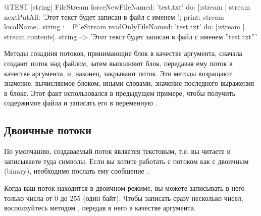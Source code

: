 \documentclass[a4paper,10pt,twoside]{book}
\begin{document}
\begin{code}{@TEST |string|}
FileStream
    forceNewFileNamed: 'test.txt'
    do: [:stream |
        stream
            nextPutAll: 'Этот текст будет записан в файл с именем ';
            print: stream localName].
string := FileStream
            readOnlyFileNamed: 'test.txt'
            do: [:stream | stream contents].
string --> 'Этот текст будет записан в файл с именем ''test.txt'''
\end{code}

Методы созадния потоков, принимающие блок в качестве аргумента, сначала создают поток над файлом, затем выполняют блок, передавая ему поток в качестве аргумента, и, наконец, закрывают поток.
Эти методы возращают значение, вычисляемое блоком, иными словами, значение последнего выражения в блоке. Этот факт использовался в предыдущем примере, чтобы получить содержимое файла и записать его в переменную .

\subsection{Двоичные потоки}

По умолчанию, создаваемый поток является текстовым, т.е. вы читаете и записываете туда символы. Если вы хотите работать с потоком как с двоичным (binary), необходимо послать ему сообщение .

Когда ваш поток находится в двоичном режиме, вы можете записывать в него только числа от 0 до 255 (один байт). Чтобы записать сразу несколько чисел, восползуйтесь методом , передав в него  в качестве аргумента.
\end{document}
